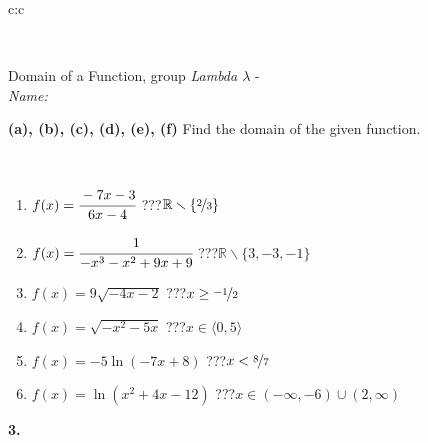 \documentclass[10pt]{report}
\begin{document}
\begin{tabular}{c:c}
\begin{minipage}[c][104.5mm][t]{0.5\linewidth}
\begin{center}
\begin{minipage}{0.20\linewidth}
\end{minipage}
\end{center}
\end{minipage}
\\ \hdashline
\begin{minipage}[c][104.5mm][t]{0.5\linewidth}
\begin{center}
\vspace{7mm}
{\huge Domain of a Function, group \textit{Lambda $\lambda$} -}\\[5mm]
\textit{Name:}\phantom{xxxxxxxxxxxxxxxxxxxxxxxxxxxxxxxxxxxxxxxxxxxxxxxxxxxxxxxxxxxxxxxxx}\\[5mm]
\begin{minipage}{0.95\linewidth}
\begin{center}
{
\textbf{(a), (b), (c), (d), (e), (f)} Find the domain of the given function. \\[1mm]
\phantom{x}
}
\end{center}
\end{minipage}
\\[4mm]
\begin{minipage}{0.79\linewidth}
\begin{center}
\begin{varwidth}{\linewidth}
\begin{enumerate}
\normalsizerrr
\item $f(x)=\cfrac{-7x-3}{6x-4}$\quad \dotfill\; ???\;\dotfill \quad $ \mathbb{R} \smallsetminus\{\nicefrac{2}{3} \}$
\item $f(x)=\cfrac{1}{-x^3-x^2+9x+9}$\quad \dotfill\; ???\;\dotfill \quad $ \mathbb{R} \smallsetminus\{3,-3,-1 \}$
\item $f(x)=9\sqrt{-4x-2}$\quad \dotfill\; ???\;\dotfill \quad $x\geq\nicefrac{-1}{2}$
\item $f(x)=\sqrt{-x^2-5x}$\quad \dotfill\; ???\;\dotfill \quad $x\in\langle0 , 5\rangle$
\item $f(x)=-5\ln{(-7x+8)}$\quad \dotfill\; ???\;\dotfill \quad $x<\nicefrac{8}{7}$
\item $f(x)=\ln{(x^2+4x-12)}$\quad \dotfill\; ???\;\dotfill \quad $x\in(-\infty , -6)\cup(2 , \infty)$
\end{enumerate}
\end{varwidth}
\end{center}
\end{minipage}
\begin{minipage}{0.20\linewidth}
\begin{center}
{\Huge\bfseries 3.} \\[2mm]

\end{center}
\end{minipage}
\end{center}
\end{minipage}
\end{tabular}
\end{document}

